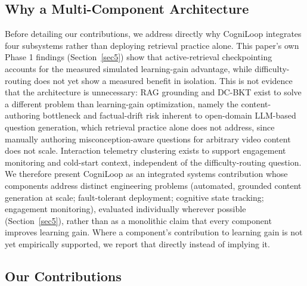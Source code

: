 \documentclass[pdflatex,sn-apa]{sn-jnl}
\begin{document}
\subsection{Why a Multi-Component Architecture}\label{sec1.1}

Before detailing our contributions, we address directly why CogniLoop integrates four subsystems rather than deploying retrieval practice alone. This paper's own Phase 1 findings (Section~\ref{sec5}) show that active-retrieval checkpointing accounts for the measured simulated learning-gain advantage, while difficulty-routing does not yet show a measured benefit in isolation. This is not evidence that the architecture is unnecessary: RAG grounding and DC-BKT exist to solve a different problem than learning-gain optimization, namely the content-authoring bottleneck and factual-drift risk inherent to open-domain LLM-based question generation, which retrieval practice alone does not address, since manually authoring misconception-aware questions for arbitrary video content does not scale. Interaction telemetry clustering exists to support engagement monitoring and cold-start context, independent of the difficulty-routing question. We therefore present CogniLoop as an integrated systems contribution whose components address distinct engineering problems (automated, grounded content generation at scale; fault-tolerant deployment; cognitive state tracking; engagement monitoring), evaluated individually wherever possible (Section~\ref{sec5}), rather than as a monolithic claim that every component improves learning gain. Where a component's contribution to learning gain is not yet empirically supported, we report that directly instead of implying it.

\subsection{Our Contributions}\label{sec1.2}
\end{document}
